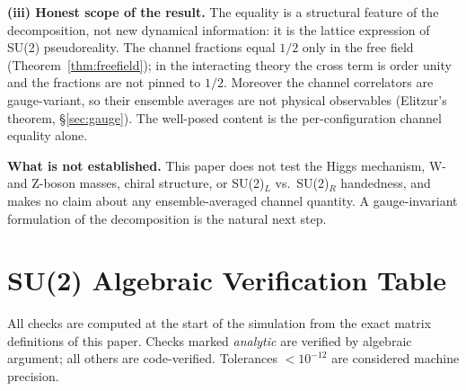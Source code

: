 \documentclass[12pt,a4paper]{article}
\begin{document}
	\textbf{(iii) Honest scope of the result.}  The equality is a structural feature of
	the decomposition, not new dynamical information: it is the lattice expression of
	SU(2) pseudoreality.  The channel fractions equal $1/2$ only in the free field
	(Theorem~\ref{thm:freefield}); in the interacting theory the cross term is order
	unity and the fractions are not pinned to $1/2$.  Moreover the channel correlators
	are gauge-variant, so their ensemble averages are not physical observables
	(Elitzur's theorem, \S\ref{sec:gauge}).  The well-posed content is the
	per-configuration channel equality alone.
	
	\textbf{What is not established.}  This paper does not test the Higgs mechanism,
	W- and Z-boson masses, chiral structure, or SU(2)$_L$ vs.\ SU(2)$_R$ handedness, and
	makes no claim about any ensemble-averaged channel quantity.  A gauge-invariant
	formulation of the decomposition is the natural next step.
	
	\appendix
	
	\section{SU(2) Algebraic Verification Table}
	
	All checks are computed at the start of the simulation from the exact matrix
	definitions of this paper.  Checks marked \emph{analytic} are verified by
	algebraic argument; all others are code-verified.  Tolerances $<10^{-12}$ are
	considered machine precision.
	
\end{document}
